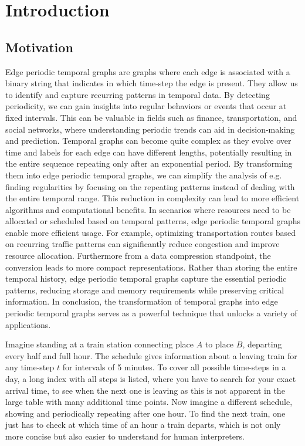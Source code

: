 \chapter{Introduction}
\label{ch:Introduction}
\section{Motivation}
\label{ch:Introduction:sec:Motivation}
Edge periodic temporal graphs are graphs where each edge is associated with a binary string that indicates in which time-step the edge is present.
They allow us to identify and capture recurring patterns in temporal data.
By detecting periodicity, we can gain insights into regular behaviors or events that occur at fixed intervals.
This can be valuable in fields such as finance, transportation, and social networks, where understanding periodic trends can aid in decision-making and prediction.
Temporal graphs can become quite complex as they evolve over time and labels for each edge can have different lengths, potentially resulting in the entire sequence repeating only after an exponential period.
By transforming them into edge periodic temporal graphs, we can simplify the analysis of e.g. finding regularities by focusing on the repeating patterns instead of dealing with the entire temporal range.
This reduction in complexity can lead to more efficient algorithms and computational benefits.
In scenarios where resources need to be allocated or scheduled based on temporal patterns, edge periodic temporal graphs enable more efficient usage.
For example, optimizing transportation routes based on recurring traffic patterns can significantly reduce congestion and improve resource allocation.
Furthermore from a data compression standpoint, the conversion leads to more compact representations.
Rather than storing the entire temporal history, edge periodic temporal graphs capture the essential periodic patterns, reducing storage and memory requirements while preserving critical information.
In conclusion, the transformation of temporal graphs into edge periodic temporal graphs serves as a powerful technique that unlocks a variety of applications.

Imagine standing at a train station connecting place $A$ to place $B$, departing every half and full hour.
The schedule gives information about a leaving train for any time-step $t$ for intervals of 5 minutes.
To cover all possible time-steps in a day, a long index with all steps is listed, where you have to search for your exact arrival time, to see when the next one is leaving as this is not apparent in the large table with many additional time points.
Now imagine a different schedule, showing and periodically repeating after one hour.
To find the next train, one just has to check at which time of an hour a train departs, which is not only more concise but also easier to understand for human interpreters.
